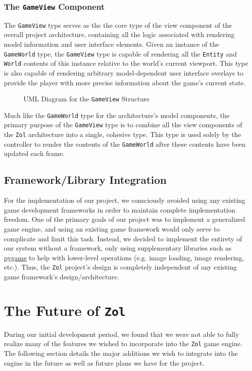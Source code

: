 \documentclass{article}
\newcommand{\classname}[1] {\texttt{#1}}
\newcommand{\projectname}[0] {\texttt{Zol} }
\newcommand{\insertdiagram}[2]
{
	\begin{figure}[H]
		\centering
		\fbox{\texttt{[image: figures/\#1]}}
		\caption{UML Diagram for the \classname{#1} Structure}
	\end{figure}
}
\begin{document}
			\subsubsection[\classname{GameView}]{The \classname{GameView} Component}
			The \classname{GameView} type serves as the the core type of the
			view component of the overall project architecture, containing all
			the logic associated with rendering model information and user
			interface elements.  Given an instance of the \classname{GameWorld}
			type, the \classname{GameView} type is capable of rendering all
			the \classname{Entity} and \classname{World} contents of this
			instance relative to the world's current viewport.  This type
			is also capable of rendering arbitrary model-dependent user
			interface overlays to provide the player with more precise
			information about the game's current state.

			\insertdiagram{GameView}{2.0in}

			Much like the \classname{GameWorld} type for the architecture's
			model components, the primary purpose of the \classname{GameView}
			type is to combine all the view components of the \projectname architecture
			into a single, cohesive type.  This type is used solely by the controller
			to render the contents of the \classname{GameWorld} after these
			contents have been updated each frame.

		\subsection{Framework/Library Integration}
		For the implementation of our project, we consciously avoided using any
		existing game development frameworks in order to maintain complete
		implementation freedom.  One of the primary goals of our project was
		to implement a generalized game engine, and using an existing game
		framework would only serve to complicate and limit this task.  Instead,
		we decided to implement the entirety of our system without a framework,
		only using supplementary libraries such as
        \href{http://www.pygame.org/news.html}{{\color{blue}\underline{pygame}}} to help with lower-level
		operations (e.g. image loading, image rendering, etc.).  Thus, the
		\projectname project's design is completely independent of any existing
		game framework's design/architecture.


	\section[Future Plans]{The Future of \projectname}
	During our initial development period, we found that we were not able to
	fully realize many of the features we wished to incorporate into the
	\projectname game engine.  The following section details the major additions
	we wish to integrate into the engine in the future as well as future plans
	we have for the project.
\end{document}

